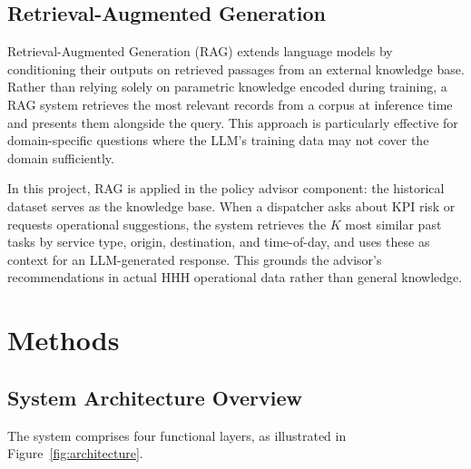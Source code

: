 \documentclass[12pt,a4paper]{article}
\begin{document}
\subsection{Retrieval-Augmented Generation}

Retrieval-Augmented Generation (RAG) \cite{lewis2020} extends language models by conditioning their outputs on retrieved passages from an external knowledge base. Rather than relying solely on parametric knowledge encoded during training, a RAG system retrieves the most relevant records from a corpus at inference time and presents them alongside the query. This approach is particularly effective for domain-specific questions where the LLM's training data may not cover the domain sufficiently.

In this project, RAG is applied in the policy advisor component: the historical  dataset serves as the knowledge base. When a dispatcher asks about KPI risk or requests operational suggestions, the system retrieves the $K$ most similar past tasks by service type, origin, destination, and time-of-day, and uses these as context for an LLM-generated response. This grounds the advisor's recommendations in actual HHH operational data rather than general knowledge.

\section{Methods}

\subsection{System Architecture Overview}

The system comprises four functional layers, as illustrated in Figure~\ref{fig:architecture}.
\end{document}
